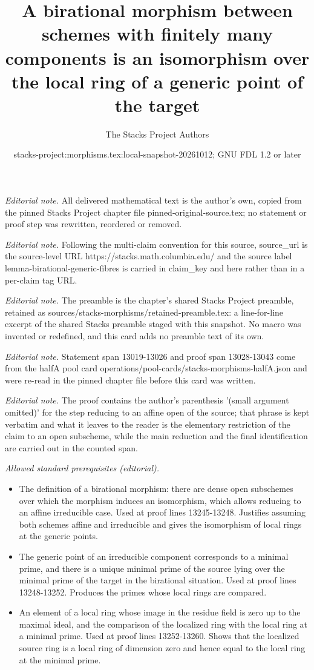 \documentclass[10pt,a4paper]{amsart}
\title{A birational morphism between schemes with finitely many components is an isomorphism over the local ring of a generic point of the target}
\author{The Stacks Project Authors}
\date{stacks-project:morphisms.tex:local-snapshot-20261012; GNU FDL 1.2 or later}
\theoremstyle{plain}
\theoremstyle{definition}
\theoremstyle{remark}
\numberwithin{equation}{subsection}
\begin{document}
\maketitle
\noindent\textit{Editorial note.} All delivered mathematical text is the author's own, copied from the pinned Stacks Project chapter file pinned-original-source.tex; no statement or proof step was rewritten, reordered or removed.\par\medskip
\noindent\textit{Editorial note.} Following the multi-claim convention for this source, source\_url is the source-level URL https://stacks.math.columbia.edu/ and the source label lemma-birational-generic-fibres is carried in claim\_key and here rather than in a per-claim tag URL.\par\medskip
\noindent\textit{Editorial note.} The preamble is the chapter's shared Stacks Project preamble, retained as sources/stacks-morphisms/retained-preamble.tex: a line-for-line excerpt of the shared Stacks preamble staged with this snapshot. No macro was invented or redefined, and this card adds no preamble text of its own.\par\medskip
\noindent\textit{Editorial note.} Statement span 13019-13026 and proof span 13028-13043 come from the halfA pool card operations/pool-cards/stacks-morphisms-halfA.json and were re-read in the pinned chapter file before this card was written.\par\medskip
\noindent\textit{Editorial note.} The proof contains the author's parenthesis '(small argument omitted)' for the step reducing to an affine open of the source; that phrase is kept verbatim and what it leaves to the reader is the elementary restriction of the claim to an open subscheme, while the main reduction and the final identification are carried out in the counted span.\par\medskip
\noindent\textit{Allowed standard prerequisites (editorial).}\begin{itemize}
\item The definition of a birational morphism: there are dense open subschemes over which the morphism induces an isomorphism, which allows reducing to an affine irreducible case. Used at proof lines 13245-13248. Justifies assuming both schemes affine and irreducible and gives the isomorphism of local rings at the generic points.
\item The generic point of an irreducible component corresponds to a minimal prime, and there is a unique minimal prime of the source lying over the minimal prime of the target in the birational situation. Used at proof lines 13248-13252. Produces the primes whose local rings are compared.
\item An element of a local ring whose image in the residue field is zero up to the maximal ideal, and the comparison of the localized ring with the local ring at a minimal prime. Used at proof lines 13252-13260. Shows that the localized source ring is a local ring of dimension zero and hence equal to the local ring at the minimal prime.
\end{itemize}\medskip
\end{document}
